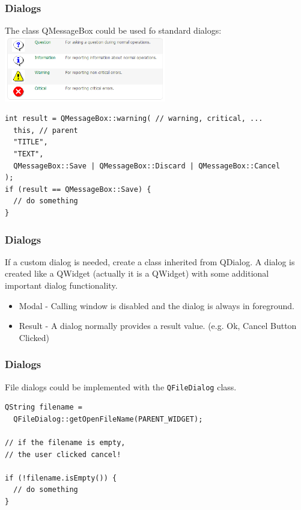 \begin{frame}[fragile]
\frametitle{Dialogs}
The class QMessageBox could be used fo standard dialogs:
\vspace{3mm}
\includegraphics[width=200pt]{img/messagebox.png}
{\tiny
\begin{lstlisting}
int result = QMessageBox::warning( // warning, critical, ...
  this, // parent
  "TITLE",
  "TEXT",
  QMessageBox::Save | QMessageBox::Discard | QMessageBox::Cancel
);
if (result == QMessageBox::Save) {
  // do something
}
\end{lstlisting}
}
\end{frame}

\begin{frame}[fragile]
\frametitle{Dialogs}
If a custom dialog is needed, create a class inherited from QDialog.
A dialog is created like a QWidget (actually it is a QWidget) with
some additional important dialog functionality.
\begin{itemize}
\item Modal - Calling window is disabled and the dialog is always in foreground.
\item Result - A dialog normally provides a result value.
(e.g. Ok, Cancel Button Clicked)
\end{itemize}
\end{frame}

\begin{frame}[fragile]
\frametitle{Dialogs}
File dialogs could be implemented with the \verb|QFileDialog| class.
\begin{lstlisting}
QString filename =
  QFileDialog::getOpenFileName(PARENT_WIDGET);

// if the filename is empty,
// the user clicked cancel!

if (!filename.isEmpty()) {
  // do something
}
\end{lstlisting}
\end{frame}

